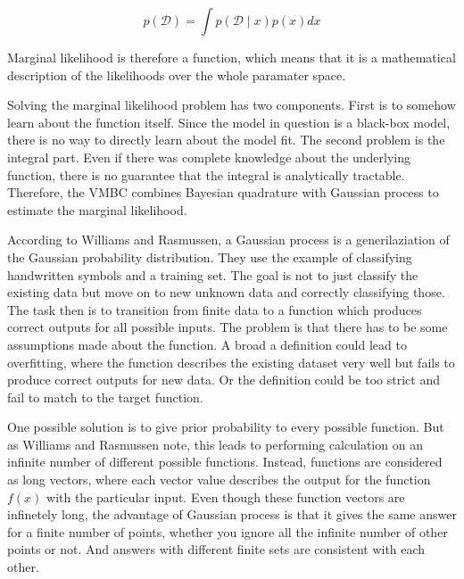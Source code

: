 \documentclass[english,oneside,openany]{UH_DS_report}
\begin{document}
$$
p(\mathcal{D})=\int p(\mathcal{D}\mid x)p(x)dx
$$

Marginal likelihood is therefore a function, which means that it is a mathematical 
description of the likelihoods over the whole paramater space.

Solving the marginal likelihood problem has two components. First is to somehow learn about the function itself.
Since the model in question is a black-box model, there is no way to directly learn about the model fit.
The second problem is the integral part. Even if there was complete knowledge about the underlying function, there is
no guarantee that the integral is analytically tractable. Therefore, the VMBC combines Bayesian quadrature with Gaussian process to
estimate the marginal likelihood.

According to Williams and Rasmussen, a Gaussian process is a generilaziation of the Gaussian
probability distribution\cite{gaussian}. They use the example of classifying handwritten symbols and 
a training set. The goal is not to just classify the existing data but move on to new unknown data 
and correctly classifying those. The task then is to transition from finite data to a function which
produces correct outputs for all possible inputs.
The problem is that there has to be some assumptions made about 
the function. A broad a definition could lead to overfitting, where the function describes 
the existing dataset very well but fails to produce correct outputs for new data. Or the 
definition could be too strict and fail to match to the target function.

One possible solution is to give prior probability to every possible function. But as Williams and Rasmussen note,
this leads to performing calculation on an infinite number of different possible functions. Instead, functions 
are considered as long vectors, where each vector value describes the output for the function $f(x)$ with the 
particular input. Even though these function vectors are infinetely long, the advantage of Gaussian process is that it 
gives the same answer for a finite number of points, whether you ignore all 
the infinite number of other points or not. And answers with different finite sets are 
consistent with each other.\cite{gaussian}
\end{document}
